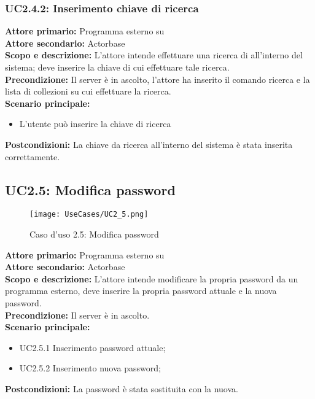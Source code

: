 \documentclass{scalatekids-article}
\begin{document}
\subsubsection{UC2.4.2: Inserimento chiave di ricerca}

\textbf{Attore primario:} Programma esterno su \\
\textbf{Attore secondario:} Actorbase\\
\textbf{Scopo e descrizione:} L'attore intende effettuare una ricerca di  all'interno del sistema; deve inserire la chiave di cui effettuare tale ricerca.\\
\textbf{Precondizione:} Il server è in ascolto, l'attore ha inserito il comando ricerca e la lista di collezioni su cui effettuare la ricerca.\\
\textbf{Scenario principale:}
\begin{itemize}
\item L'utente può inserire la chiave di ricerca
\end{itemize}
\textbf{Postcondizioni:} La chiave da ricerca all'interno del sistema è stata inserita correttamente.

\subsection{UC2.5: Modifica password}

\begin{figure}[H]
  \begin{center}
    \texttt{[image: UseCases/UC2\_5.png]}
    \caption*{Caso d'uso 2.5: Modifica password}
  \end{center}
\end{figure}
\textbf{Attore primario:} Programma esterno su \\
\textbf{Attore secondario:} Actorbase\\
\textbf{Scopo e descrizione:} L'attore intende modificare la propria password da un programma  esterno, deve inserire la propria password attuale e la nuova password.\\
\textbf{Precondizione:} Il server è in ascolto.\\
\textbf{Scenario principale:}
\begin{itemize}
\item UC2.5.1 Inserimento password attuale;
\item UC2.5.2 Inserimento nuova password;
\end{itemize}
\textbf{Postcondizioni:} La password è stata sostituita con la nuova.
\end{document}
